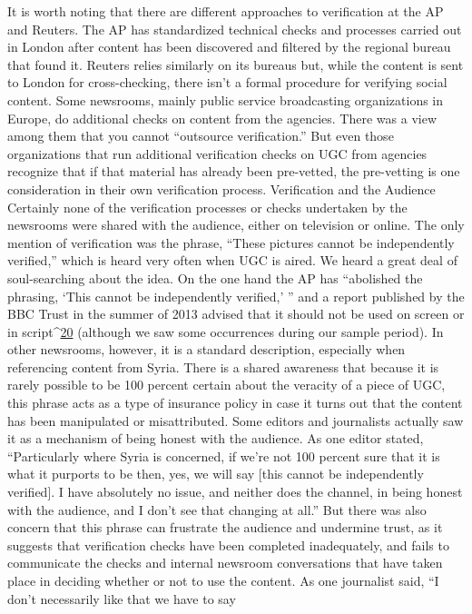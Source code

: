 \begin{enumerate}
It is worth noting that there are different approaches to verification at the
AP and Reuters. The AP has standardized technical checks and processes
carried out in London after content has been discovered and filtered by the
regional bureau that found it. Reuters relies similarly on its bureaus but,
while the content is sent to London for cross-checking, there isn't a formal
procedure for verifying social content.
Some newsrooms, mainly public service broadcasting organizations in
Europe, do additional checks on content from the agencies. There was a
view among them that you cannot ``outsource verification.'' But even those
organizations that run additional verification checks on UGC from agencies
recognize that if that material has already been pre-vetted, the pre-vetting is
one consideration in their own verification process.
Verification and the Audience
Certainly none of the verification processes or checks undertaken by the
newsrooms were shared with the audience, either on television or online.
The only mention of verification was the phrase, ``These pictures cannot be
independently verified,'' which is heard very often when UGC is aired. We
heard a great deal of soul-searching about the idea.
On the one hand the AP has ``abolished the phrasing, ‘This cannot be independently
verified,' '' and a report published by the BBC Trust in the summer
of 2013 advised that it should not be used on screen or in script^{\href{#endnotes}{20}} (although
we saw some occurrences during our sample period). In other newsrooms,
however, it is a standard description, especially when referencing content
from Syria.
There is a shared awareness that because it is rarely possible to be 100 percent
certain about the veracity of a piece of UGC, this phrase acts as a type
of insurance policy in case it turns out that the content has been manipulated
or misattributed. Some editors and journalists actually saw it as a
mechanism of being honest with the audience. As one editor stated, ``Particularly where Syria is concerned, if we're not 100 percent sure that it is
what it purports to be then, yes, we will say [this cannot be independently
verified]. I have absolutely no issue, and neither does the channel, in being
honest with the audience, and I don't see that changing at all.''
But there was also concern that this phrase can frustrate the audience and
undermine trust, as it suggests that verification checks have been completed
inadequately, and fails to communicate the checks and internal newsroom
conversations that have taken place in deciding whether or not to use the
content. As one journalist said, ``I don't necessarily like that we have to say

\end{enumerate}
